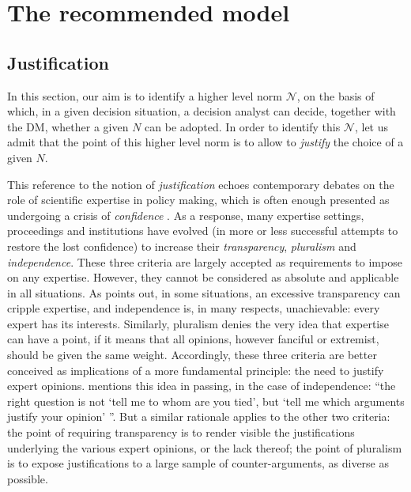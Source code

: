 \documentclass[preprint, french, english, 11pt, authoryear]{elsarticle}%
\newcommand{\adv}{\mathscr{N}}
\begin{document}
\section{The recommended model}
\label{sec:recomm}
\subsection{Justification}
In this section, our aim is to identify a higher level norm $\adv$, on the basis of which, in a given decision situation, a decision analyst can decide, together with the \ac{DM}, whether a given $N$ can be adopted. In order to identify this $\adv$, let us admit that the point of this higher level norm is to allow to \emph{justify} the choice of a given $N$.

This reference to the notion of \emph{justification} echoes contemporary debates on the role of scientific expertise in policy making, which is often enough presented as undergoing a crisis of \emph{confidence} \citep{godard_environnement_2015}. As a response, many expertise settings, proceedings and institutions have evolved (in more or less successful attempts to restore the lost confidence) to increase their \emph{transparency}, \emph{pluralism} and \emph{independence}. These three criteria are largely accepted as requirements to impose on any expertise. However, they cannot be considered as absolute and applicable in all situations. As \citet{godard_environnement_2015} points out, in some situations, an excessive transparency can cripple expertise, and independence is, in many respects, unachievable: every expert has its interests. Similarly, pluralism denies the very idea that expertise can have a point, if it means that all opinions, however fanciful or extremist, should be given the same weight. Accordingly, these three criteria are better conceived as implications of a more fundamental principle: the need to justify expert opinions. \citet[][p. 379]{godard_environnement_2015} mentions this idea in passing, in the case of independence: “the right question is not `tell me to whom are you tied', but `tell me which arguments justify your opinion' ”. But a similar rationale applies to the other two criteria: the point of requiring transparency is to render visible the justifications underlying the various expert opinions, or the lack thereof; the point of pluralism is to expose justifications to a large sample of counter-arguments, as diverse as possible.
\end{document}
